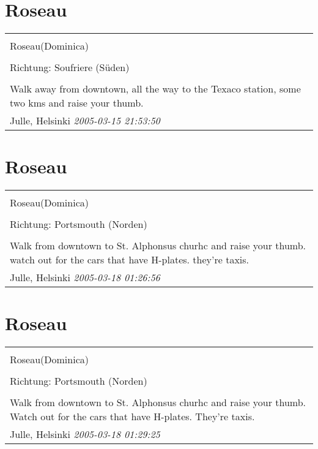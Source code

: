 \documentclass[a4paper,12pt]{article}
\begin{document}
\section{Roseau}
\begin{tabular}{|p{13cm}|}
\hline\\
Roseau(Dominica)\\
\\
Richtung: Soufriere (Süden) \\
\hline\\
Walk away from downtown, all the way to the Texaco station, some two kms and raise your thumb. \\
Julle, Helsinki \textit{ 2005-03-15 21:53:50 }\\\hline
\end{tabular}


\section{Roseau}
\begin{tabular}{|p{13cm}|}
\hline\\
Roseau(Dominica)\\
\\
Richtung: Portsmouth (Norden) \\
\hline\\
Walk from downtown to St. Alphonsus churhc and raise your thumb. watch out for the cars that have H-plates. they're taxis. \\
Julle, Helsinki \textit{ 2005-03-18 01:26:56 }\\\hline
\end{tabular}


\section{Roseau}
\begin{tabular}{|p{13cm}|}
\hline\\
Roseau(Dominica)\\
\\
Richtung: Portsmouth (Norden) \\
\hline\\
Walk from downtown to St. Alphonsus churhc and raise your thumb. Watch out for the cars that have H-plates. They're taxis. \\
Julle, Helsinki \textit{ 2005-03-18 01:29:25 }\\\hline
\end{tabular}
\end{document}
